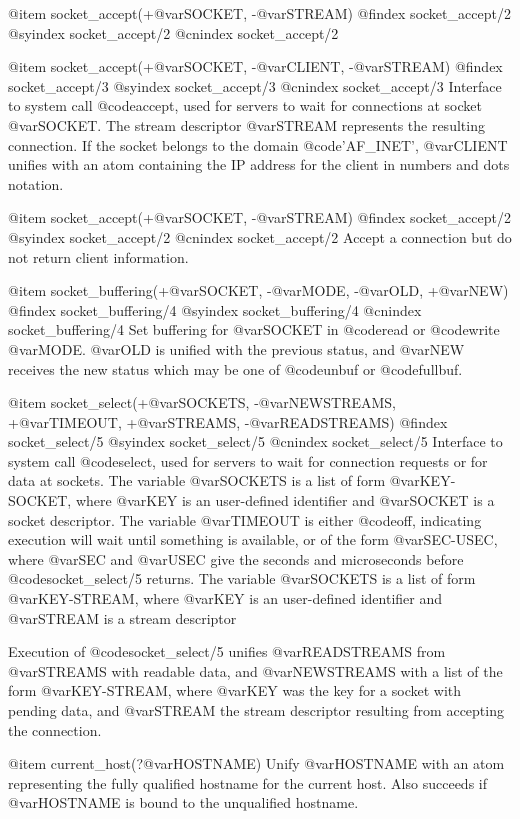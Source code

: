 {{{{{{@item socket_accept(+@var{SOCKET}, -@var{STREAM})
@findex socket_accept/2
@syindex socket_accept/2
@cnindex socket_accept/2

@item socket_accept(+@var{SOCKET}, -@var{CLIENT}, -@var{STREAM})
@findex socket_accept/3
@syindex socket_accept/3
@cnindex socket_accept/3
Interface to system call @code{accept}, used for servers to wait for
connections at socket @var{SOCKET}. The stream descriptor @var{STREAM}
represents the resulting connection.  If the socket belongs to the
domain @code{'AF_INET'}, @var{CLIENT} unifies with an atom containing
the IP address for the client in numbers and dots notation.

@item socket_accept(+@var{SOCKET}, -@var{STREAM})
@findex socket_accept/2
@syindex socket_accept/2
@cnindex socket_accept/2
Accept a connection but do not return client information.

@item socket_buffering(+@var{SOCKET}, -@var{MODE}, -@var{OLD}, +@var{NEW})
@findex socket_buffering/4
@syindex socket_buffering/4
@cnindex socket_buffering/4
Set buffering for @var{SOCKET} in @code{read} or @code{write}
@var{MODE}. @var{OLD} is unified with the previous status, and @var{NEW}
receives the new status which may be one of @code{unbuf} or
@code{fullbuf}.

@item socket_select(+@var{SOCKETS}, -@var{NEWSTREAMS}, +@var{TIMEOUT}, +@var{STREAMS}, -@var{READSTREAMS})
@findex socket_select/5
@syindex socket_select/5
@cnindex socket_select/5
Interface to system call @code{select}, used for servers to wait for
connection requests or for data at sockets. The variable
@var{SOCKETS} is a list of form @var{KEY-SOCKET}, where @var{KEY} is
an user-defined identifier and @var{SOCKET} is a socket descriptor. The
variable @var{TIMEOUT} is either @code{off}, indicating execution will
wait until something is available, or of the form @var{SEC-USEC}, where
@var{SEC} and @var{USEC} give the seconds and microseconds before
@code{socket_select/5} returns. The variable @var{SOCKETS} is a list of
form @var{KEY-STREAM}, where @var{KEY} is an user-defined identifier
and @var{STREAM} is a stream descriptor

Execution of @code{socket_select/5} unifies @var{READSTREAMS} from
@var{STREAMS} with readable data, and @var{NEWSTREAMS} with a list of
the form @var{KEY-STREAM}, where @var{KEY} was the key for a socket
with pending data, and @var{STREAM} the stream descriptor resulting
from accepting the connection.  

@item current_host(?@var{HOSTNAME})
Unify @var{HOSTNAME} with an atom representing the fully qualified
hostname for the current host. Also succeeds if @var{HOSTNAME} is bound
to the unqualified hostname.

}}}}}}
